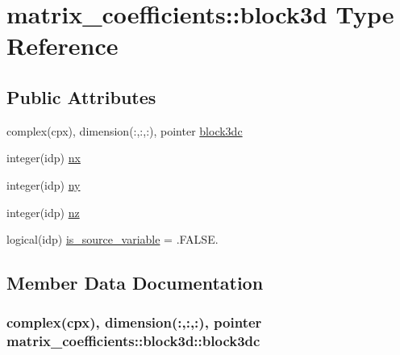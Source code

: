 \hypertarget{structmatrix__coefficients_1_1block3d}{}\section{matrix\+\_\+coefficients\+:\+:block3d Type Reference}
\label{structmatrix__coefficients_1_1block3d}
\subsection*{Public Attributes}
\begin{DoxyCompactItemize}
\item 
complex(cpx), dimension(\+:,\+:,\+:), pointer \hyperlink{structmatrix__coefficients_1_1block3d_a99914e62a62db923fcb366de146e92e0}{block3dc}
\item 
integer(idp) \hyperlink{structmatrix__coefficients_1_1block3d_af4e4f83e09cc6967c8204cd22ba39ce7}{nx}
\item 
integer(idp) \hyperlink{structmatrix__coefficients_1_1block3d_a5b50d6852afa142b18507bed4feaf58f}{ny}
\item 
integer(idp) \hyperlink{structmatrix__coefficients_1_1block3d_aaef29da070e781dbf45d55e239521f98}{nz}
\item 
logical(idp) \hyperlink{structmatrix__coefficients_1_1block3d_a5804e48e4dad384abb0789ad932b04d9}{is\+\_\+source\+\_\+variable} = .F\+A\+L\+S\+E.
\end{DoxyCompactItemize}


\subsection{Member Data Documentation}
\subsubsection[{\texorpdfstring{block3dc}{block3dc}}]{\setlength{\rightskip}{0pt plus 5cm}complex(cpx), dimension(\+:,\+:,\+:), pointer matrix\+\_\+coefficients\+::block3d\+::block3dc}\hypertarget{structmatrix__coefficients_1_1block3d_a99914e62a62db923fcb366de146e92e0}{}\label{structmatrix__coefficients_1_1block3d_a99914e62a62db923fcb366de146e92e0}
